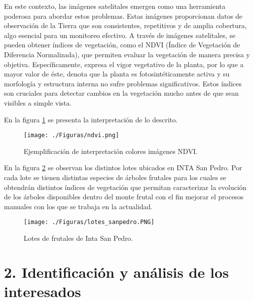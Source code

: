 \documentclass[
11pt, %
]{charter}
\begin{document}
En este contexto, las imágenes satelitales emergen como una herramienta poderosa para abordar estos problemas. Estas imágenes proporcionan datos 
de observación de la Tierra que son consistentes, repetitivos y de amplia cobertura, algo esencial para un monitoreo efectivo. 
A través de imágenes satelitales, se pueden obtener índices de vegetación, como el NDVI (Índice de Vegetación de Diferencia Normalizada), 
que permiten evaluar la vegetación de manera precisa y objetiva. Específicamente, expresa el vigor vegetativo de la planta, por lo que a mayor valor de éste, denota que la planta es fotosintéticamente 
activa y su morfología y estructura interna no sufre problemas significativos. Estos índices son cruciales para detectar cambios en la vegetación mucho antes 
de que sean visibles a simple vista. 

En la figura \ref{fig:ndvi} se presenta la interpretación de lo descrito.

\begin{figure}[htpb]
\centering 
\texttt{[image: ./Figuras/ndvi.png]}
\caption{Ejemplificación de interpretación colores imágenes NDVI.}
\label{fig:ndvi}
\end{figure}

En la figura \ref{fig:lotes} se observan los distintos lotes ubicados en INTA San Pedro. Por cada lote se
tienen distintas especies de árboles frutales para los cuales se obtendrán distintos índices de vegetación
que permitan caracterizar la evolución de los árboles disponibles dentro del monte frutal con el fin mejorar 
el procesos manuales con los que se trabaja en la actualidad.


\begin{figure}[htpb]
    \centering 
    \texttt{[image: ./Figuras/lotes\_sanpedro.PNG]}
    \caption{Lotes de frutales de Inta San Pedro.}
    \label{fig:lotes}
\end{figure}


\section{2. Identificación y análisis de los interesados}
\label{sec:interesados}
\end{document}
